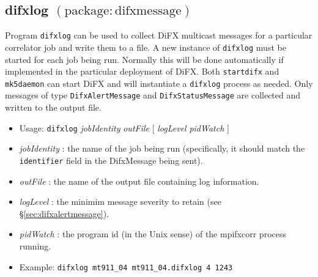 
\subsection{difxlog {\small $\mathrm{(package: difxmessage)}$}} \label{sec:difxlogprogram} 

Program {\tt difxlog} can be used to collect DiFX multicast messages for a particular correlator job and write them to a file.
A new instance of {\tt difxlog} must be started for each job being run.
Normally this will be done automatically if implemented in the particular deployment of DiFX.
Both {\tt startdifx} and {\tt mk5daemon} can start DiFX and will instantiate a {\tt difxlog} process as needed.
Only messages of type {\tt DifxAlertMessage} and {\tt DifxStatusMessage} are collected and written to the output file.

\begin{itemize}
\item[] Usage: {\tt difxlog} {\em jobIdentity} {\em outFile} $[$ {\em logLevel} {\em pidWatch} $]$ 
\item[] {\em jobIdentity} : the name of the job being run (specifically, it should match the {\tt identifier} field in the DifxMessage being sent).
\item[] {\em outFile} : the name of the output file containing log information.
\item[] {\em logLevel} : the minimim message severity to retain (see \S\ref{sec:difxalertmessage}).
\item[] {\em pidWatch} : the program id (in the Unix sense) of the mpifxcorr process running.
\item[] Example: {\tt difxlog mt911\_04 mt911\_04.difxlog 4 1243}
\end{itemize}

